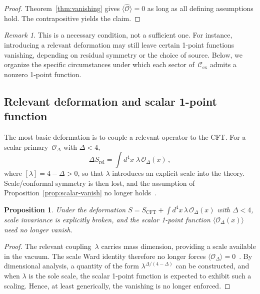 \documentclass[
  aps,
  prd,
  preprint,
  groupedaddress,
  nofootinbib,
  longbibliography
]{revtex4-2}
\newtheorem{proposition}[definition]{Proposition}
\theoremstyle{remark}
\newtheorem{remark}[definition]{Remark}
\newcommand{\Cex}{\mathcal{C}_{\mathrm{ex}}}
\begin{document}
\begin{proof}
Theorem~\ref{thm:vanishing} gives
$\langle\hat{\mathcal{O}}\rangle=0$ as long as all defining
assumptions hold.
The contrapositive yields the claim.
\end{proof}

\begin{remark}\label{rem:not-sufficient}
This is a necessary condition, not a sufficient one.
For instance, introducing a relevant deformation may still leave
certain 1-point functions vanishing, depending on residual
symmetry or the choice of source.
Below, we organize the specific circumstances under which each
sector of~$\Cex$ admits a nonzero 1-point function.
\end{remark}

\subsection{Relevant deformation and scalar 1-point function}%
  \label{subsec:3-2}

The most basic deformation is to couple a relevant operator to
the CFT\@.
For a scalar primary~$\mathcal{O}_\Delta$ with $\Delta<4$,
\begin{equation}\label{eq:relevant-def}
  \Delta S_{\mathrm{rel}}
  = \int d^4x\;\lambda\,\mathcal{O}_\Delta(x)\,,
\end{equation}
where $[\lambda]=4-\Delta>0$, so that $\lambda$ introduces an
explicit scale into the theory.
Scale/conformal symmetry is then lost, and the assumption of
Proposition~\ref{prop:scalar-vanish} no longer
holds~\cite{ref13,ref14}.

\begin{proposition}\label{prop:relevant}
Under the deformation
$S = S_{\mathrm{CFT}} + \int d^4x\,\lambda\,
\mathcal{O}_\Delta(x)$ with $\Delta<4$,
scale invariance is explicitly broken, and the scalar 1-point
function
$\langle\mathcal{O}_\Delta(x)\rangle$
need no longer vanish.
\end{proposition}

\begin{proof}
The relevant coupling~$\lambda$ carries mass dimension, providing
a scale available in the vacuum.
The scale Ward identity therefore no longer forces
$\langle\mathcal{O}_\Delta\rangle=0$~\cite{ref13,ref14}.
By dimensional analysis, a quantity of the form
$\lambda^{\Delta/(4-\Delta)}$ can be constructed, and when
$\lambda$ is the sole scale, the scalar 1-point function is
expected to exhibit such a scaling.
Hence, at least generically, the vanishing is no longer enforced.
\end{proof}
\end{document}
